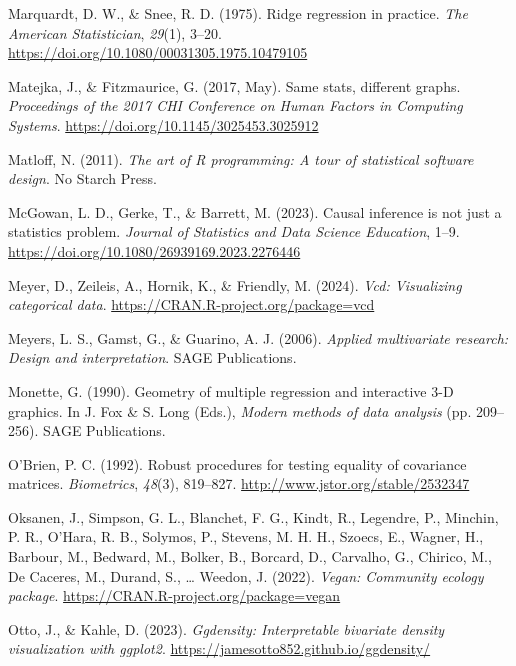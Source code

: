 \documentclass[
  letterpaper,
  10pt,
  krantz2]{krantz}
\newlength{\cslhangindent}
\newenvironment{CSLReferences}[2] %
 {\begin{list}{}{%
  \setlength{\itemindent}{0pt}
  \setlength{\leftmargin}{0pt}
  \setlength{\parsep}{0pt}
  \ifodd #1
   \setlength{\leftmargin}{\cslhangindent}
   \setlength{\itemindent}{-1\cslhangindent}
  \fi
  \setlength{\itemsep}{#2\baselineskip}}}
 {\end{list}}
\begin{document}
\begin{CSLReferences}{1}{0}
Marquardt, D. W., \& Snee, R. D. (1975). Ridge regression in practice.
\emph{The American Statistician}, \emph{29}(1), 3--20.
\url{https://doi.org/10.1080/00031305.1975.10479105}

Matejka, J., \& Fitzmaurice, G. (2017, May). Same stats, different
graphs. \emph{Proceedings of the 2017 {CHI} Conference on Human Factors
in Computing Systems}. \url{https://doi.org/10.1145/3025453.3025912}

Matloff, N. (2011). \emph{The art of {R} programming: {A} tour of
statistical software design}. No Starch Press.

McGowan, L. D., Gerke, T., \& Barrett, M. (2023). Causal inference is
not just a statistics problem. \emph{Journal of Statistics and Data
Science Education}, 1--9.
\url{https://doi.org/10.1080/26939169.2023.2276446}

Meyer, D., Zeileis, A., Hornik, K., \& Friendly, M. (2024). \emph{Vcd:
Visualizing categorical data}.
\url{https://CRAN.R-project.org/package=vcd}

Meyers, L. S., Gamst, G., \& Guarino, A. J. (2006). \emph{Applied
multivariate research: Design and interpretation}. SAGE Publications.

Monette, G. (1990). Geometry of multiple regression and interactive
3-{D} graphics. In J. Fox \& S. Long (Eds.), \emph{Modern methods of
data analysis} (pp. 209--256). SAGE Publications.

O'Brien, P. C. (1992). Robust procedures for testing equality of
covariance matrices. \emph{Biometrics}, \emph{48}(3), 819--827.
\url{http://www.jstor.org/stable/2532347}

Oksanen, J., Simpson, G. L., Blanchet, F. G., Kindt, R., Legendre, P.,
Minchin, P. R., O'Hara, R. B., Solymos, P., Stevens, M. H. H., Szoecs,
E., Wagner, H., Barbour, M., Bedward, M., Bolker, B., Borcard, D.,
Carvalho, G., Chirico, M., De Caceres, M., Durand, S., \ldots{} Weedon,
J. (2022). \emph{Vegan: Community ecology package}.
\url{https://CRAN.R-project.org/package=vegan}

Otto, J., \& Kahle, D. (2023). \emph{Ggdensity: Interpretable bivariate
density visualization with ggplot2}.
\url{https://jamesotto852.github.io/ggdensity/}


\end{CSLReferences}
\end{document}
